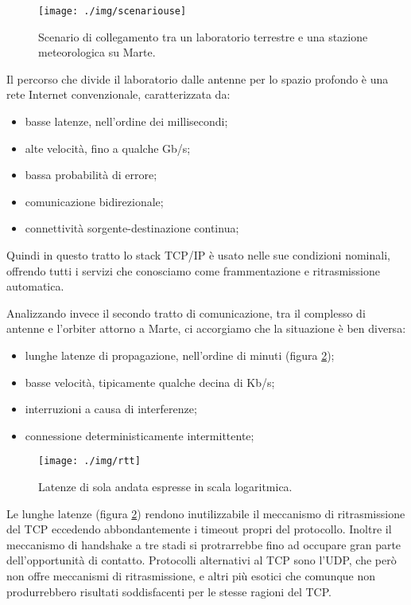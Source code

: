 \documentclass[12pt,a4paper,oneside]{book}
\begin{document}
		\begin{figure}[h]
			\centering
			\texttt{[image: ./img/scenariouse]}
			\caption{Scenario di collegamento tra un laboratorio terrestre e una stazione meteorologica su Marte.}
			\label{fig:scenariomars}
		\end{figure}
		
		Il percorso che divide il laboratorio dalle antenne per lo spazio profondo è una rete Internet convenzionale, caratterizzata da:
		\begin{itemize}
			\item basse latenze, nell'ordine dei millisecondi;
			\item alte velocità, fino a qualche Gb/s;
			\item bassa probabilità di errore;
			\item comunicazione bidirezionale;
			\item connettività sorgente-destinazione continua;
		\end{itemize}
		Quindi in questo tratto lo stack TCP/IP è usato nelle sue condizioni nominali, offrendo tutti i servizi che conosciamo come frammentazione e ritrasmissione automatica. 
		
		Analizzando invece il secondo tratto di comunicazione, tra il complesso di antenne e l'orbiter attorno a Marte, ci accorgiamo che la situazione è ben diversa:
		\begin{itemize}
			\item lunghe latenze di propagazione, nell'ordine di minuti (figura \ref{fig:rtt});
			\item basse velocità, tipicamente qualche decina di Kb/s;
			\item interruzioni a causa di interferenze;
			\item connessione deterministicamente intermittente;
		\end{itemize}
		
		\begin{figure}[h]
			\centering
			\texttt{[image: ./img/rtt]}
			\caption{Latenze di sola andata espresse in scala logaritmica.}
			\label{fig:rtt}
		\end{figure}
		
		Le lunghe latenze (figura \ref{fig:rtt}) rendono inutilizzabile il meccanismo di ritrasmissione del TCP eccedendo abbondantemente i timeout propri del protocollo. Inoltre il meccanismo di handshake a tre stadi si protrarrebbe fino ad occupare gran parte dell'opportunità di contatto. Protocolli alternativi al TCP sono l'UDP, che però non offre meccanismi di ritrasmissione, e altri più esotici che comunque non produrrebbero risultati soddisfacenti per le stesse ragioni del TCP.
		
\end{document}
